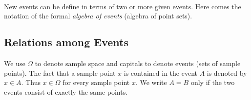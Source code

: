 \documentclass{article}
\numberwithin{equation}{subsection}
\begin{document}
			\paragraph{} New events can be define in terms of two or more given events. Here comes the notation of the formal \textit{algebra of events} (algebra of point sets).
		\subsection{Relations among Events}
			\paragraph{} We use $\Omega$ to denote sample space and capitals to denote events (sets of sample points). The fact that a sample point $x$ is contained in the event $A$ is denoted by $x \in A$. Thus $x \in \Omega$ for every sample point $x$. We write $A=B$ only if the two events consist of exactly the same points.
\end{document}
